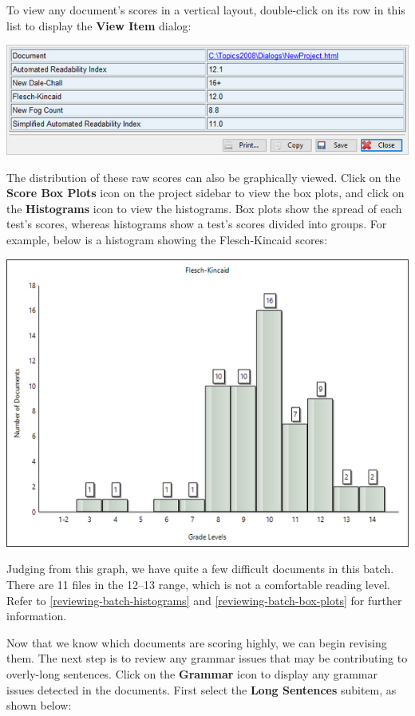 \documentclass[
]{book}
\theoremstyle{definition}
\theoremstyle{definition}
\theoremstyle{definition}
\theoremstyle{definition}
\theoremstyle{remark}
\begin{document}
To view any document's scores in a vertical layout, double-click on its row in this list to display the \textbf{View Item} dialog:

\includegraphics{Images/viewitemrawscores.png}

The distribution of these raw scores can also be graphically viewed. Click on the \textbf{Score Box Plots} icon on the project sidebar to view the box plots, and click on the \textbf{Histograms} icon to view the histograms. Box plots show the spread of each test's scores, whereas histograms show a test's scores divided into groups. For example, below is a histogram showing the Flesch-Kincaid scores:

\includegraphics{Images/histogrades.png}

Judging from this graph, we have quite a few difficult documents in this batch. There are 11 files in the 12--13 range, which is not a comfortable reading level. Refer to \ref{reviewing-batch-histograms} and \ref{reviewing-batch-box-plots} for further information.

Now that we know which documents are scoring highly, we can begin revising them. The next step is to review any grammar issues that may be contributing to overly-long sentences. Click on the \textbf{Grammar} icon to display any grammar issues detected in the documents. First select the \textbf{Long Sentences} subitem, as shown below:
\end{document}
